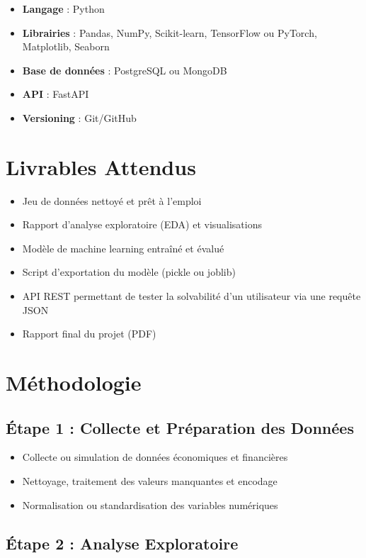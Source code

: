 \documentclass[12pt]{article}
\begin{document}
	\begin{itemize}[label=--]
		\item \textbf{Langage} : Python
		\item \textbf{Librairies} : Pandas, NumPy, Scikit-learn, TensorFlow ou PyTorch, Matplotlib, Seaborn
		\item \textbf{Base de données} : PostgreSQL ou MongoDB
		\item \textbf{API} : FastAPI
		\item \textbf{Versioning} : Git/GitHub
	\end{itemize}
	
	\section{Livrables Attendus}
	
	\begin{itemize}[label=--]
		\item Jeu de données nettoyé et prêt à l’emploi
		\item Rapport d’analyse exploratoire (EDA) et visualisations
		\item Modèle de machine learning entraîné et évalué
		\item Script d’exportation du modèle (pickle ou joblib)
		\item API REST permettant de tester la solvabilité d’un utilisateur via une requête JSON
		\item Rapport final du projet (PDF)
	\end{itemize}
	
	\section{Méthodologie}
	
	\subsection{Étape 1 : Collecte et Préparation des Données}
	
	\begin{itemize}[label=--]
		\item Collecte ou simulation de données économiques et financières
		\item Nettoyage, traitement des valeurs manquantes et encodage
		\item Normalisation ou standardisation des variables numériques
	\end{itemize}
	
	\subsection{Étape 2 : Analyse Exploratoire}
	
\end{document}
